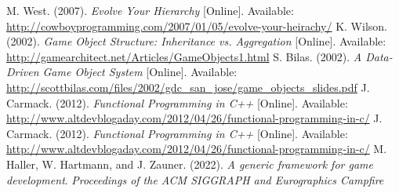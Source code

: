 \begin{thebibliography}{1}
M. West. (2007). \emph{Evolve Your Hierarchy} [Online]. Available: \url{http://cowboyprogramming.com/2007/01/05/evolve-your-heirachy/}
K. Wilson. (2002). \emph{Game Object Structure: Inheritance vs. Aggregation} [Online]. Available: \url{http://gamearchitect.net/Articles/GameObjects1.html}
S. Bilas. (2002). \emph{A Data-Driven Game Object System} [Online]. Available: \url{http://scottbilas.com/files/2002/gdc_san_jose/game_objects_slides.pdf}
J. Carmack. (2012). \emph{Functional Programming in C++} [Online]. Available: \url{http://www.altdevblogaday.com/2012/04/26/functional-programming-in-c/}
J. Carmack. (2012). \emph{Functional Programming in C++} [Online]. Available: \url{http://www.altdevblogaday.com/2012/04/26/functional-programming-in-c/}
M. Haller, W. Hartmann, and J. Zauner. (2022). \emph{A generic framework for game development}. \emph{Proceedings of the ACM SIGGRAPH and Eurographics Campfire}
\end{thebibliography}

